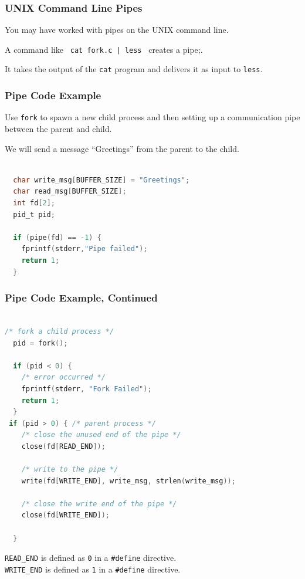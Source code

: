 \begin{frame}
	\frametitle{UNIX Command Line Pipes}

	You may have worked with pipes on the UNIX command line.

	A command like \texttt{ cat fork.c | less } creates a pipe;.

	It takes the output of the \texttt{cat} program and delivers it as input to \texttt{less}.

\end{frame}

\begin{frame}[fragile]
	\frametitle{Pipe Code Example}

	Use \texttt{fork} to spawn a new child process and then setting up a communication pipe between the parent and child.

	We will send a message ``Greetings'' from the parent to the child.

	\begin{lstlisting}[language=C]

  char write_msg[BUFFER_SIZE] = "Greetings"; 
  char read_msg[BUFFER_SIZE];
  int fd[2];
  pid_t pid;

  if (pipe(fd) == -1) {
    fprintf(stderr,"Pipe failed");
    return 1;
  }

\end{lstlisting}


\end{frame}

\begin{frame}[fragile]
	\frametitle{Pipe Code Example, Continued}

	\begin{lstlisting}[language=C]

/* fork a child process */
  pid = fork();
  
  if (pid < 0) { 
    /* error occurred */ 
    fprintf(stderr, "Fork Failed"); 
    return 1;
  }
 if (pid > 0) { /* parent process */
    /* close the unused end of the pipe */ 
    close(fd[READ_END]);
    
    /* write to the pipe */
    write(fd[WRITE_END], write_msg, strlen(write_msg));
    
    /* close the write end of the pipe */
    close(fd[WRITE_END]);
    
  } 

\end{lstlisting}

	\texttt{READ\_END} is defined as \texttt{0} in a \texttt{\#define} directive.\\
	\texttt{WRITE\_END} is defined as \texttt{1} in a \texttt{\#define} directive.

\end{frame}

